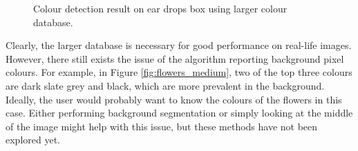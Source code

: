 \documentclass[a4paper,11pt]{article}
\begin{document}
\begin{figure}[H]
\centering
{}
\caption{Colour detection result on ear drops box using larger colour database.}
\label{fig:drops_medium}
\end{figure}

Clearly, the larger database is necessary for good performance on real-life images. However, there still exists the issue of the algorithm reporting background pixel colours. For example, in Figure \ref{fig:flowers_medium}, two of the top three colours are dark slate grey and black, which are more prevalent in the background. Ideally, the user would probably want to know the colours of the flowers in this case. Either performing background segmentation or simply looking at the middle of the image might help with this issue, but these methods have not been explored yet.
\end{document}
